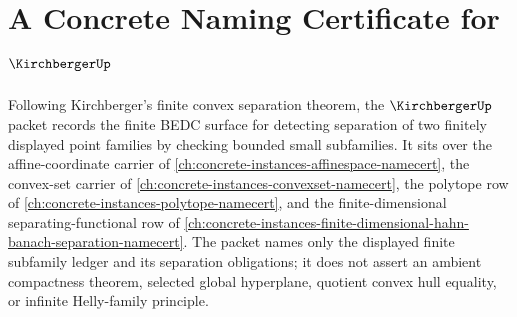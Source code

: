 \chapter{A Concrete Naming Certificate for $\KirchbergerUp$}
\label{ch:concrete-instances-kirchberger-namecert}

Following Kirchberger's finite convex separation theorem, the $\KirchbergerUp$ packet records the finite BEDC surface for detecting separation of two finitely displayed point families by checking bounded small subfamilies. It sits over the affine-coordinate carrier of \autoref{ch:concrete-instances-affinespace-namecert}, the convex-set carrier of \autoref{ch:concrete-instances-convexset-namecert}, the polytope row of \autoref{ch:concrete-instances-polytope-namecert}, and the finite-dimensional separating-functional row of \autoref{ch:concrete-instances-finite-dimensional-hahn-banach-separation-namecert}. The packet names only the displayed finite subfamily ledger and its separation obligations; it does not assert an ambient compactness theorem, selected global hyperplane, quotient convex hull equality, or infinite Helly-family principle.

